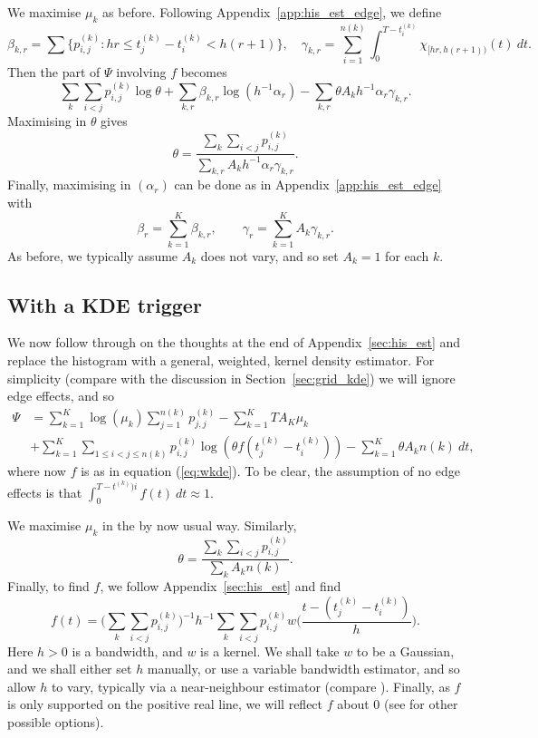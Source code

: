 \documentclass[twoside,a4paper]{article}
\theoremstyle{plain}
\theoremstyle{definition}
\begin{document}
We maximise $\mu_k$ as before.  Following Appendix~\ref{app:his_est_edge}, we define
\[ \beta_{k,r} = \sum \big\{ p^{(k)}_{i,j} : hr \leq t^{(k)}_j - t^{(k)}_i
< h(r+1) \big\}, \quad
\gamma_{k,r} = \sum_{i=1}^{n(k)} \int_0^{T-t^{(k)}_i}
\chi_{[hr,h(r+1))}(t) \ dt. \]
Then the part of $\Psi$ involving $f$ becomes
\[ \sum_k \sum_{i<j} p^{(k)}_{i,j} \log\theta
+ \sum_{k,r} \beta_{k,r} \log(h^{-1}\alpha_r)
- \sum_{k,r} \theta A_k h^{-1} \alpha_r \gamma_{k,r}. \]
Maximising in $\theta$ gives
\[ \theta = \frac{\sum_k \sum_{i<j} p^{(k)}_{i,j}}{\sum_{k,r} A_k h^{-1}\alpha_r\gamma_{k,r}}. \]
Finally, maximising in $(\alpha_r)$ can be done as in Appendix~\ref{app:his_est_edge}
with
\[ \beta_r = \sum_{k=1}^K \beta_{k,r}, 
\qquad
\gamma_r = \sum_{k=1}^K A_k \gamma_{k,r}. \]
As before, we typically assume $A_k$ does not vary, and so set $A_k=1$ for each $k$.



\subsection{With a KDE trigger}\label{app:grid_kde}

We now follow through on the thoughts at the end of Appendix~\ref{sec:his_est}
and replace the histogram with a general, weighted, kernel density estimator.
For simplicity (compare with the discussion in Section~\ref{sec:grid_kde}) we will
ignore edge effects, and so
\begin{align*}
\Psi &= \sum_{k=1}^K \log(\mu_k) \sum_{j=1}^{n(k)} p^{(k)}_{j,j}
  - \sum_{k=1}^K TA_K\mu_k \\
&+\sum_{k=1}^K \sum_{1\leq i<j\leq n(k)} p^{(k)}_{i,j} \log(\theta f(t^{(k)}_j - t^{(k)}_i))
- \sum_{k=1}^K \theta A_k n(k) \ dt,
\end{align*}
where now $f$ is as in equation (\ref{eq:wkde}).  To be clear, the assumption of
no edge effects is that $\int_0^{T-t^{(k)})i} f(t) \ dt \approx 1$.

We maximise $\mu_k$ in the by now usual way.  Similarly,
\[ \theta = \frac{\sum_k\sum_{i<j} p^{(k)}_{i,j}}{\sum_k A_k n(k)}. \]
Finally, to find $f$, we follow Appendix~\ref{sec:his_est} and find
\[ f(t) = \Big( \sum_k \sum_{i<j} p^{(k)}_{i,j} \Big)^{-1}
h^{-1} \sum_k \sum_{i<j} p^{(k)}_{i,j} w\Big( \frac{t - (t^{(k)}_j - t^{(k)}_i)}{h} \Big).
\]
Here $h>0$ is a bandwidth, and $w$ is a kernel.  We shall take $w$ to be a Gaussian, and we
shall either set $h$ manually, or use a variable bandwidth estimator, and so allow $h$ to
vary, typically via a near-neighbour estimator (compare \cite[Appendix]{sepp}).
Finally, as $f$ is only supported on the positive real line, we will reflect $f$ about $0$
(see \cite[Section~2.10]{sil} for other possible options).
\end{document}
